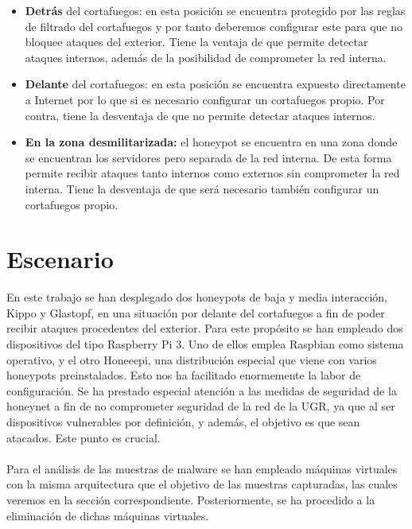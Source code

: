 \documentclass[journal]{IEEEtran}
\begin{document}
\begin{itemize}
	\item \textbf{Detrás} del cortafuegos: en esta posición se encuentra protegido por las reglas de filtrado del cortafuegos y por tanto deberemos configurar este para que no bloquee ataques del exterior. Tiene la ventaja de que permite detectar ataques internos, además de la posibilidad de comprometer la red interna.
	\item \textbf{Delante} del cortafuegos: en esta posición se encuentra expuesto directamente a Internet por lo que si es necesario configurar un cortafuegos propio. Por contra, tiene la desventaja de que no permite detectar ataques internos.
	\item \textbf{En la zona desmilitarizada:} el honeypot se encuentra en una zona donde se encuentran los servidores pero separada de la red interna. De esta forma permite recibir ataques tanto internos como externos sin comprometer la red interna. Tiene la desventaja de que será necesario también configurar un cortafuegos propio.
\end{itemize}


\section{Escenario}

En este trabajo se han desplegado dos honeypots de baja y media interacción, Kippo y Glastopf, en una situación por delante del cortafuegos a fin de poder recibir ataques procedentes del exterior. Para este propósito se han empleado dos dispositivos del tipo Raspberry Pi 3. Uno de ellos emplea Raspbian como sistema operativo, y el otro Honeeepi, una distribución especial que viene con varios honeypots preinstalados. Esto nos ha facilitado enormemente la labor de configuración. Se ha prestado especial atención a las medidas de seguridad de la honeynet a fin de no comprometer seguridad de la red de la UGR, ya que al ser dispositivos vulnerables por definición, y además, el objetivo es que sean atacados. Este punto es crucial.
\\\\
Para el análisis de las muestras de malware se han empleado máquinas virtuales con la misma arquitectura que el objetivo de las muestras capturadas, las cuales veremos en la sección correspondiente. Posteriormente, se ha procedido a la eliminación de dichas máquinas virtuales.
\end{document}
